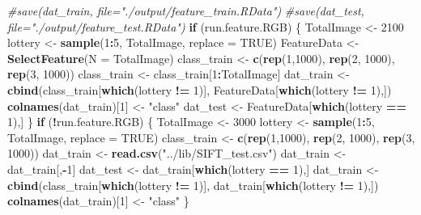 \documentclass[]{article}
\newenvironment{Shaded}{\begin{snugshade}}{\end{snugshade}}
\newcommand{\KeywordTok}[1]{\textcolor[rgb]{0.13,0.29,0.53}{\textbf{#1}}}
\newcommand{\DataTypeTok}[1]{\textcolor[rgb]{0.13,0.29,0.53}{#1}}
\newcommand{\DecValTok}[1]{\textcolor[rgb]{0.00,0.00,0.81}{#1}}
\newcommand{\StringTok}[1]{\textcolor[rgb]{0.31,0.60,0.02}{#1}}
\newcommand{\CommentTok}[1]{\textcolor[rgb]{0.56,0.35,0.01}{\textit{#1}}}
\newcommand{\OtherTok}[1]{\textcolor[rgb]{0.56,0.35,0.01}{#1}}
\newcommand{\ControlFlowTok}[1]{\textcolor[rgb]{0.13,0.29,0.53}{\textbf{#1}}}
\newcommand{\OperatorTok}[1]{\textcolor[rgb]{0.81,0.36,0.00}{\textbf{#1}}}
\newcommand{\NormalTok}[1]{#1}
\begin{document}
\begin{Shaded}
\begin{Highlighting}[]
\CommentTok{#save(dat_train, file="./output/feature_train.RData")}
\CommentTok{#save(dat_test, file="./output/feature_test.RData")}
\ControlFlowTok{if}\NormalTok{ (run.feature.RGB)}
\NormalTok{\{}
\NormalTok{  TotalImage <-}\StringTok{ }\DecValTok{2100}
\NormalTok{  lottery <-}\StringTok{ }\KeywordTok{sample}\NormalTok{(}\DecValTok{1}\OperatorTok{:}\DecValTok{5}\NormalTok{, TotalImage, }\DataTypeTok{replace =} \OtherTok{TRUE}\NormalTok{)}
\NormalTok{  FeatureData <-}\StringTok{ }\KeywordTok{SelectFeature}\NormalTok{(}\DataTypeTok{N =}\NormalTok{ TotalImage)}
\NormalTok{  class_train <-}\StringTok{ }\KeywordTok{c}\NormalTok{(}\KeywordTok{rep}\NormalTok{(}\DecValTok{1}\NormalTok{,}\DecValTok{1000}\NormalTok{), }\KeywordTok{rep}\NormalTok{(}\DecValTok{2}\NormalTok{, }\DecValTok{1000}\NormalTok{), }\KeywordTok{rep}\NormalTok{(}\DecValTok{3}\NormalTok{, }\DecValTok{1000}\NormalTok{))}
\NormalTok{  class_train <-}\StringTok{ }\NormalTok{class_train[}\DecValTok{1}\OperatorTok{:}\NormalTok{TotalImage]}
\NormalTok{  dat_train <-}\StringTok{ }\KeywordTok{cbind}\NormalTok{(class_train[}\KeywordTok{which}\NormalTok{(lottery }\OperatorTok{!=}\StringTok{ }\DecValTok{1}\NormalTok{)], FeatureData[}\KeywordTok{which}\NormalTok{(lottery }\OperatorTok{!=}\StringTok{ }\DecValTok{1}\NormalTok{),])}
  \KeywordTok{colnames}\NormalTok{(dat_train)[}\DecValTok{1}\NormalTok{] <-}\StringTok{ "class"}
\NormalTok{  dat_test <-}\StringTok{  }\NormalTok{FeatureData[}\KeywordTok{which}\NormalTok{(lottery }\OperatorTok{==}\StringTok{ }\DecValTok{1}\NormalTok{),]}
\NormalTok{\}}
\ControlFlowTok{if}\NormalTok{ (}\OperatorTok{!}\NormalTok{run.feature.RGB)}
\NormalTok{\{}
\NormalTok{  TotalImage <-}\StringTok{ }\DecValTok{3000}
\NormalTok{  lottery <-}\StringTok{ }\KeywordTok{sample}\NormalTok{(}\DecValTok{1}\OperatorTok{:}\DecValTok{5}\NormalTok{, TotalImage, }\DataTypeTok{replace =} \OtherTok{TRUE}\NormalTok{)}
\NormalTok{  class_train <-}\StringTok{ }\KeywordTok{c}\NormalTok{(}\KeywordTok{rep}\NormalTok{(}\DecValTok{1}\NormalTok{,}\DecValTok{1000}\NormalTok{), }\KeywordTok{rep}\NormalTok{(}\DecValTok{2}\NormalTok{, }\DecValTok{1000}\NormalTok{), }\KeywordTok{rep}\NormalTok{(}\DecValTok{3}\NormalTok{, }\DecValTok{1000}\NormalTok{))}
\NormalTok{  dat_train <-}\StringTok{ }\KeywordTok{read.csv}\NormalTok{(}\StringTok{"../lib/SIFT_test.csv"}\NormalTok{)}
\NormalTok{  dat_train <-}\StringTok{ }\NormalTok{dat_train[,}\OperatorTok{-}\DecValTok{1}\NormalTok{]}
\NormalTok{  dat_test <-}\StringTok{ }\NormalTok{dat_train[}\KeywordTok{which}\NormalTok{(lottery }\OperatorTok{==}\StringTok{ }\DecValTok{1}\NormalTok{),]}
\NormalTok{  dat_train <-}\StringTok{ }\KeywordTok{cbind}\NormalTok{(class_train[}\KeywordTok{which}\NormalTok{(lottery }\OperatorTok{!=}\StringTok{ }\DecValTok{1}\NormalTok{)], dat_train[}\KeywordTok{which}\NormalTok{(lottery }\OperatorTok{!=}\StringTok{ }\DecValTok{1}\NormalTok{),])}
  \KeywordTok{colnames}\NormalTok{(dat_train)[}\DecValTok{1}\NormalTok{] <-}\StringTok{ "class"}
\NormalTok{\}}
\end{Highlighting}
\end{Shaded}
\end{document}
